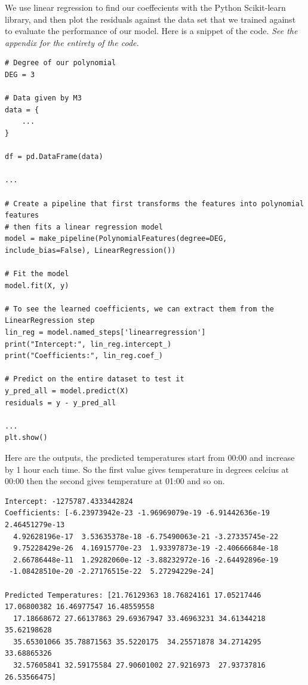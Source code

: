 \documentclass[11pt]{article}
\begin{document}
We use linear regression to find our coeffecients with the Python Scikit-learn library, and then plot the residuals against
the data set that we trained against to evaluate the performance of our model. Here is a snippet of the code.
\textit{See the appendix for the entirety of the code.}

\begin{verbatim}
# Degree of our polynomial
DEG = 3

# Data given by M3
data = {
    ...
}

df = pd.DataFrame(data)

...

# Create a pipeline that first transforms the features into polynomial features
# then fits a linear regression model
model = make_pipeline(PolynomialFeatures(degree=DEG, include_bias=False), LinearRegression())

# Fit the model
model.fit(X, y)

# To see the learned coefficients, we can extract them from the LinearRegression step
lin_reg = model.named_steps['linearregression']
print("Intercept:", lin_reg.intercept_)
print("Coefficients:", lin_reg.coef_)

# Predict on the entire dataset to test it
y_pred_all = model.predict(X)
residuals = y - y_pred_all

...
plt.show()
\end{verbatim}

Here are the outputs, the predicted temperatures start from 00:00 and increase by 1 hour each time. So the first value gives
temperature in degrees celcius at 00:00 then the second gives temperature at 01:00 and so on.
\label{sec:results1}
\begin{verbatim}
Intercept: -1275787.4333442824
Coefficients: [-6.23973942e-23 -1.96969079e-19 -6.91442636e-19  2.46451279e-13
  4.92628196e-17  3.53635378e-18 -6.75490063e-21 -3.27335745e-22
  9.75228429e-26  4.16915770e-23  1.93397873e-19 -2.40666684e-18
  2.66786448e-11  1.29282060e-12 -3.88232972e-16 -2.64492896e-19
 -1.08428510e-20 -2.27176515e-22  5.27294229e-24]

Predicted Temperatures: [21.76129363 18.76824161 17.05217446 17.06800382 16.46977547 16.48559558
  17.18668672 27.66137863 29.69367947 33.46963231 34.61344218 35.62198628
  35.65301066 35.78871563 35.5220175  34.25571878 34.2714295  33.68865326
  32.57605841 32.59175584 27.90601002 27.9216973  27.93737816 26.53566475]
\end{verbatim}
\end{document}
